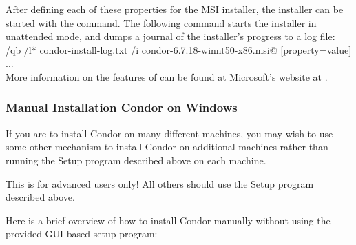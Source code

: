 After defining each of these properties for the MSI installer, the
installer can be started with the \verb@msiexec@ command. The following
command starts the installer in unattended mode, and dumps a journal of
the installer's progress to a log file:\\
\verb@msiexec /qb /l* condor-install-log.txt /i condor-6.7.18-winnt50-x86.msi@ [property=value] ... \\

More information on the features of \verb@msiexec@
can be found at Microsoft's website at
.

\subsubsection{\label{sec:NT-Manual-Install}Manual Installation Condor on Windows}

If you are to install Condor on many different machines, you may wish
to use some other mechanism to install Condor on additional machines
rather than running the Setup program described above on each machine.

\Warn This is for advanced users only!  All others should use the Setup program described above. 

Here is a brief overview of how to install Condor manually without using the provided GUI-based setup program:

